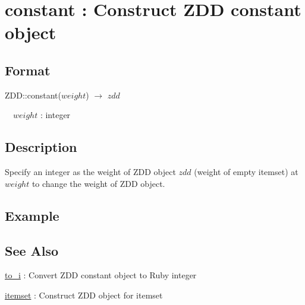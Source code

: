 
\section{constant : Construct ZDD constant object\label{sect:constant}}
\subsection*{Format}
ZDD::constant($weight$) $\rightarrow$ $zdd$

~~$weight$ : integer

\subsection*{Description}
Specify an integer as the weight of ZDD object $zdd$ (weight of empty itemset) at $weight$ to change the weight of ZDD object. 


\subsection*{Example}


\subsection*{See Also}
\hyperref[sect:to_i]{to\_i} : Convert ZDD constant object to Ruby integer

\hyperref[sect:itemset]{itemset} : Construct ZDD object for itemset

